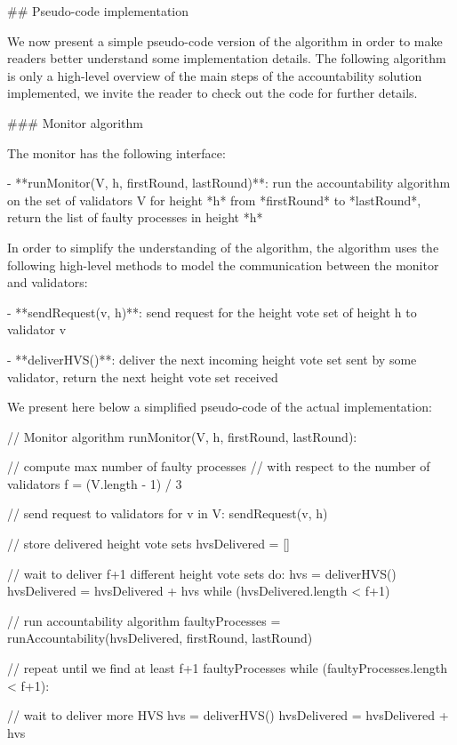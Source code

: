 \documentclass[a4paper,11pt,oneside]{report}
\begin{document}
\begin{markdown}
## Pseudo-code implementation

We now present a simple pseudo-code version of the algorithm in order to make readers better understand some implementation details.
The following algorithm is only a high-level overview of the main steps of the accountability solution implemented, we invite the reader to check out the code for further details.  

### Monitor algorithm

The monitor has the following interface:

- **runMonitor(V, h, firstRound, lastRound)**: run the accountability algorithm on the set of validators V for height *h* from *firstRound* to *lastRound*, return the list of faulty processes in height *h*

In order to simplify the understanding of the algorithm, the algorithm uses the following high-level methods to model the communication between the monitor and validators:

- **sendRequest(v, h)**: send request for the height vote set of height h to validator v 

- **deliverHVS()**: deliver the next incoming height vote set sent by some validator, return the next height vote set received

We present here below a simplified pseudo-code of the actual  implementation:

    // Monitor algorithm
    runMonitor(V, h, firstRound, lastRound):
        
        // compute max number of faulty processes
        // with respect to the number of validators  
        f = (V.length - 1) / 3
        
        // send request to validators
        for v in V:
            sendRequest(v, h)
        
        // store delivered height vote sets
        hvsDelivered = []
        
        // wait to deliver f+1 different height vote sets
        do:
            hvs = deliverHVS()
            hvsDelivered = hvsDelivered + hvs
        while (hvsDelivered.length < f+1)
        
        // run accountability algorithm
        faultyProcesses = runAccountability(hvsDelivered, firstRound, lastRound)
        
        // repeat until we find at least f+1 faultyProcesses
        while (faultyProcesses.length < f+1):
        
            // wait to deliver more HVS
            hvs = deliverHVS()
            hvsDelivered = hvsDelivered + hvs
        

\end{markdown}
\end{document}
